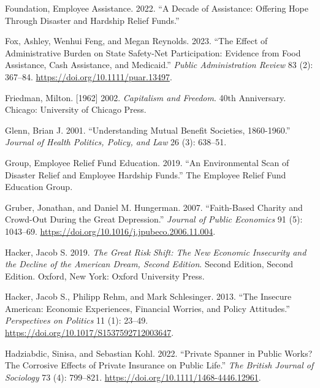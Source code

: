 \documentclass[
  11pt,
  oneside]{article}
\newlength{\cslhangindent}
\newenvironment{CSLReferences}[2] %
 {\begin{list}{}{%
  \setlength{\itemindent}{0pt}
  \setlength{\leftmargin}{0pt}
  \setlength{\parsep}{0pt}
  \ifodd #1
   \setlength{\leftmargin}{\cslhangindent}
   \setlength{\itemindent}{-1\cslhangindent}
  \fi
  \setlength{\itemsep}{#2\baselineskip}}}
 {\end{list}}
\begin{document}
\begin{CSLReferences}{1}{0}
Foundation, Employee Assistance. 2022. {``A {Decade} of {Assistance}: Offering Hope Through Disaster and Hardship Relief Funds.''}

Fox, Ashley, Wenhui Feng, and Megan Reynolds. 2023. {``The Effect of Administrative Burden on State Safety-Net Participation: {Evidence} from Food Assistance, Cash Assistance, and {Medicaid}.''} \emph{Public Administration Review} 83 (2): 367--84. \url{https://doi.org/10.1111/puar.13497}.

Friedman, Milton. {[}1962{]} 2002. \emph{Capitalism and {Freedom}}. 40th Anniversary. Chicago: University of Chicago Press.

Glenn, Brian J. 2001. {``Understanding {Mutual Benefit Societies}, 1860-1960.''} \emph{Journal of Health Politics, Policy, and Law} 26 (3): 638--51.

Group, Employee Relief Fund Education. 2019. {``An {Environmental Scan} of {Disaster Relief} and {Employee Hardship Funds}.''} The Employee Relief Fund Education Group.

Gruber, Jonathan, and Daniel M. Hungerman. 2007. {``Faith-Based Charity and Crowd-Out During the Great Depression.''} \emph{Journal of Public Economics} 91 (5): 1043--69. \url{https://doi.org/10.1016/j.jpubeco.2006.11.004}.

Hacker, Jacob S. 2019. \emph{The {Great Risk Shift}: {The New Economic Insecurity} and the {Decline} of the {American Dream}, {Second Edition}}. Second Edition, Second Edition. Oxford, New York: Oxford University Press.

Hacker, Jacob S., Philipp Rehm, and Mark Schlesinger. 2013. {``The {Insecure American}: {Economic Experiences}, {Financial Worries}, and {Policy Attitudes}.''} \emph{Perspectives on Politics} 11 (1): 23--49. \url{https://doi.org/10.1017/S1537592712003647}.

Hadziabdic, Sinisa, and Sebastian Kohl. 2022. {``Private Spanner in Public Works? {The} Corrosive Effects of Private Insurance on Public Life.''} \emph{The British Journal of Sociology} 73 (4): 799--821. \url{https://doi.org/10.1111/1468-4446.12961}.


\end{CSLReferences}
\end{document}
